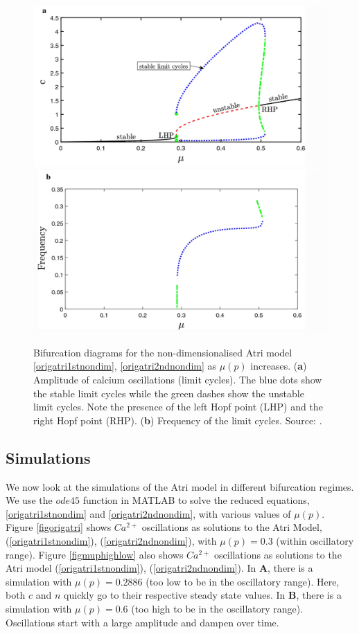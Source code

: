 \begin{figure}[h!!!t!!!b!!!p]
  \centering
  \includegraphics[width=1\linewidth]{Chapters/2_Ca2+_Models/extras/cbifmu.PNG}
  \includegraphics[width=1\linewidth]{Chapters/2_Ca2+_Models/extras/freqbigmu.PNG}
  \caption{Bifurcation diagrams for the non-dimensionalised Atri model \eqref{origatri1stnondim}, \eqref{origatri2ndnondim} as $\mu(p)$ increases. (\textbf{a}) Amplitude of calcium oscillations (limit cycles). The blue dots show the stable limit cycles while the green dashes show the unstable limit cycles. Note the presence of the left Hopf point (LHP) and the right Hopf point (RHP). {(\textbf{b}) Frequency of the limit cycles. }Source: . }\label{Kaouribif}
\end{figure}

\subsection{Simulations}
We now look at the simulations of the Atri model in different bifurcation regimes. We use the $ode45$ function in MATLAB \cite{MATLAB2020} to solve {the reduced }equations, \eqref{origatri1stnondim} and \eqref{origatri2ndnondim}, with various values of $\mu(p)$. Figure \ref{figorigatri} shows $Ca^{2+}$ oscillations as solutions to the Atri Model, (\ref{origatri1stnondim}), (\ref{origatri2ndnondim}), with $\mu(p)=0.3$ (within oscillatory range). Figure \ref{figmuphighlow} also shows $Ca^{2+}$ oscillations as solutions to the Atri model (\ref{origatri1stnondim}), (\ref{origatri2ndnondim}). In \textbf{A}, there is a simulation with $\mu(p)=0.2886$ (too low to be in the oscillatory range). Here, both $c$ and $n$ quickly go to their respective steady state values. In \textbf{B}, there is a simulation with $\mu(p)=0.6$ (too high to be in the oscillatory range). Oscillations start with a large amplitude and dampen over time.

